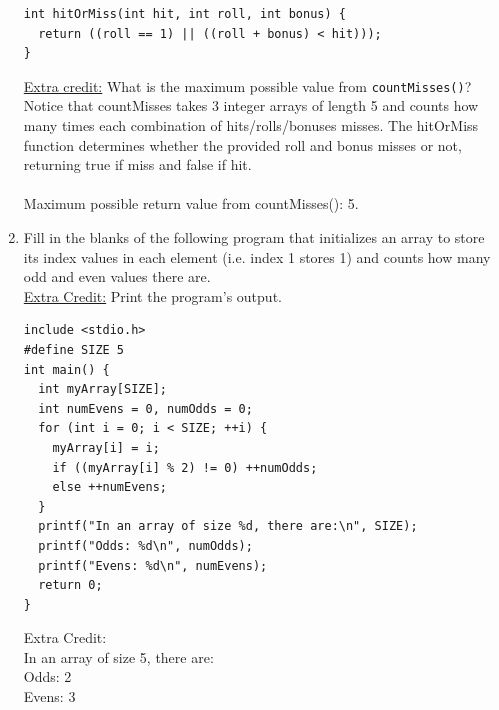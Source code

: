 \documentclass[letter,11pt]{article}
\begin{document}
\begin{enumerate}
\begin{verbatim}
int hitOrMiss(int hit, int roll, int bonus) {
  return ((roll == 1) || ((roll + bonus) < hit)));   
}
    \end{verbatim}
    \underline{Extra credit:} What is the maximum possible value from \texttt{countMisses()}? \\
    {\color{red}Notice that countMisses takes 3 integer arrays of length 5 and counts how many times each combination of hits/rolls/bonuses misses. The hitOrMiss function determines whether the provided roll and bonus misses or not, returning true if miss and false if hit. \\ \\ Maximum possible return value from countMisses(): 5.}
    
    \item Fill in the blanks of the following program that initializes an array to store its index values in each element (i.e. index 1 stores 1) and counts how many odd and even values there are. \\
    \underline{Extra Credit:} Print the program’s output.
    \begin{verbatim}
include <stdio.h>
#define SIZE 5
int main() {
  int myArray[SIZE];
  int numEvens = 0, numOdds = 0;
  for (int i = 0; i < SIZE; ++i) {
    myArray[i] = i;
    if ((myArray[i] % 2) != 0) ++numOdds;
    else ++numEvens;
  }
  printf("In an array of size %d, there are:\n", SIZE);
  printf("Odds: %d\n", numOdds);
  printf("Evens: %d\n", numEvens);
  return 0;
}
    \end{verbatim}
    {\color{red}Extra Credit: \\
In an array of size 5, there are: \\
Odds: 2 \\
Evens: 3}
\end{enumerate}
\end{document}

